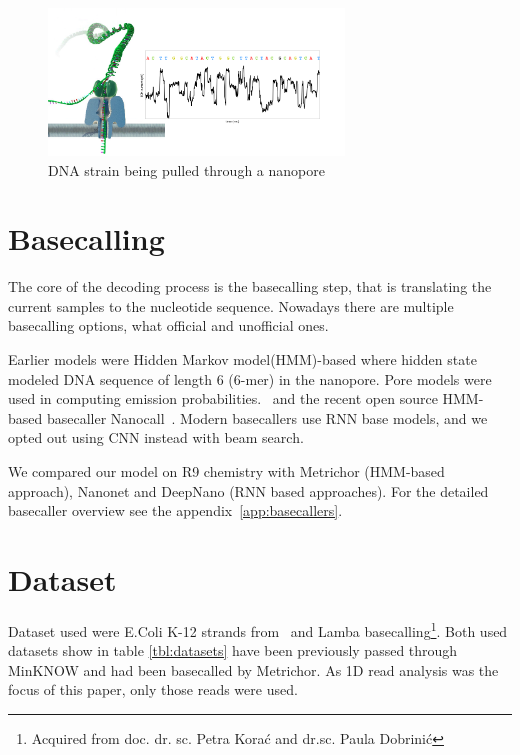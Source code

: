 \documentclass[runningheads,a4paper]{llncs}
\begin{document}
\begin{figure}[!ht]
    \begin{center}
        \includegraphics[width=0.7\textwidth]{./imgs/nanopore.png}
        \caption[DNA strain being pulled through a nanopore]{DNA strain being pulled through a nanopore \protect\footnotemark}
        \label{fg:nanopore}
    \end{center}
\end{figure}

\section{Basecalling}
The core of the decoding process is the basecalling step, that is translating the current samples to the nucleotide sequence. Nowadays there are multiple basecalling options, what official and unofficial ones.

Earlier models were Hidden Markov model(HMM)-based where hidden state modeled DNA sequence of length 6 (6-mer) in the nanopore. Pore models were used in computing emission probabilities.~\cite{loman2015complete,schreiber2015analysis,szalay2015novo,timp2012dna} and the recent open source HMM-based basecaller Nanocall~\cite{david2016nanocall}. Modern basecallers use RNN base models, and we opted out using CNN instead with beam search.

We compared our model on R9 chemistry with Metrichor (HMM-based approach), Nanonet and DeepNano (RNN based approaches). For the detailed basecaller overview see the appendix~\ref{app:basecallers}.


\section{Dataset}

Dataset used were E.Coli K-12 strands from~\cite{loman1-100k} and Lamba basecalling\footnote{Acquired from doc. dr. sc. Petra Korać and dr.sc. Paula Dobrinić}. Both used datasets show in table \ref{tbl:datasets} have been previously passed through MinKNOW and had been basecalled by Metrichor. As 1D read analysis was the focus of this paper, only those reads were used.
\end{document}
